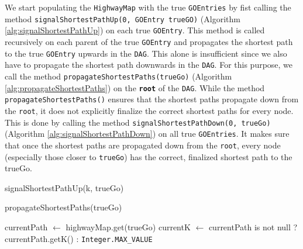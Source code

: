 \documentclass[12pt]{article}
\begin{document}
We start populating the \texttt{HighwayMap} with the true \texttt{GOEntries}
by fist calling the method \texttt{signalShortestPathUp(0, GOEntry trueGO)} (Algorithm \ref{alg:signalShortestPathUp}) on each true \texttt{GOEntry}.
This method is called recursively on each parent of the true \texttt{GOEntry} and
propagates the shortest path to the true \texttt{GOEntry} upwards in the \texttt{DAG}.
This alone is insufficient since we also have to propagate the shortest path
downwards in the \texttt{DAG}. 
For this purpose, we call the method \texttt{propagateShortestPaths(trueGo)} (Algorithm \ref{alg:propagateShortestPaths}) on the \texttt{\textbf{root}} 
of the \texttt{DAG}.
While the method \texttt{propagateShortestPaths()} ensures that the shortest paths propagate 
down from the \texttt{root}, it does not explicitly finalize the correct shortest 
paths for every node. This is done by calling the method \texttt{signalShortestPathDown(0, trueGo)} (Algorithm \ref{alg:signalShortestPathDown}) on all true \texttt{GOEntries}.
It makes sure that once the shortest paths are propagated down from the \texttt{root}, 
every node (especially those closer to \texttt{trueGo}) has the correct, 
finalized shortest path to the trueGo.

\begin{algorithm}[!htbp]
\caption{signalShortestPathUp(k, trueGo)}\label{alg:signalShortestPathUp}
\end{algorithm}


\begin{algorithm}[!htbp]
\caption{propagateShortestPaths(trueGo)}\label{alg:propagateShortestPaths}
currentPath $\gets$ highwayMap.get(trueGo) \;
currentK $\gets$ currentPath is not null ? currentPath.getK() : \texttt{Integer.MAX\_VALUE} \;
\end{algorithm}
\end{document}
